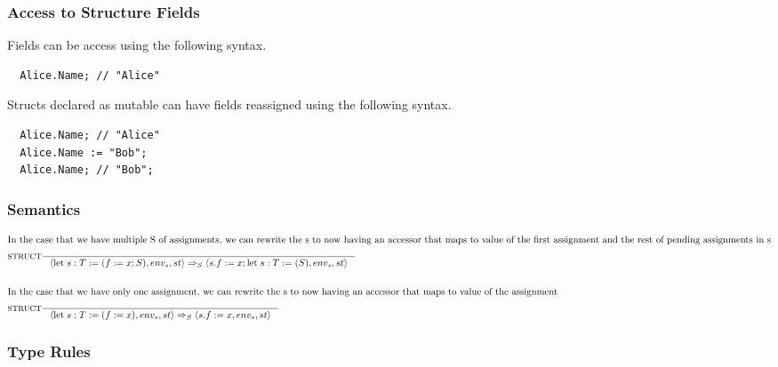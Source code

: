 \subsubsection{Access to Structure Fields}
\label{sec:accessStructFields}

Fields can be access using the following syntax.

\begin{verbatim}
  Alice.Name; // "Alice"
\end{verbatim}

Structs declared as mutable can have fields reassigned using the following syntax.

\begin{verbatim}
  Alice.Name; // "Alice"
  Alice.Name := "Bob";
  Alice.Name; // "Bob";
\end{verbatim}
 
\subsubsection{Semantics}

\begin{align*}
\intertext{In the case that we have multiple S of assignments, we can rewrite the s to now having an accessor that maps to value of the first assignment and the rest of pending assignments in s}
&\inference[$\text{STRUCT}$]{}
                            {\Braket{\Tlet \; s:T := (f := x;S),env_s,st} \Rightarrow_S \Braket{s.f := x;\Tlet \; s:T := (S),env_s,st}}
\\\\
\intertext{In the case that we have only one assignment, we can rewrite the s to now having an accessor that maps to value of the assignment}
&\inference[$\text{STRUCT}$]{}
                            {\Braket{\Tlet \; s:T := (f := x),env_s,st} \Rightarrow_S \Braket{s.f := x,env_s,st}}
\end{align*}

\subsubsection{Type Rules}

